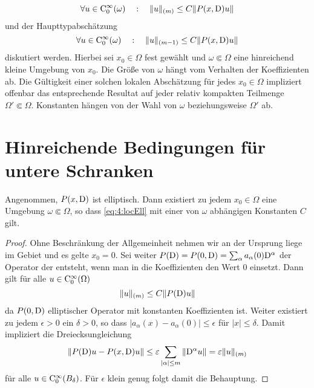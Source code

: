 \begin{equation}\label{eq:4:locEll}
\forall u\in\mathrm C_0^\infty(\omega)\quad:\quad    \| u\|_{(m)} \le C \| P(x,\mathrm D) u \|
\end{equation}
und der Haupttypabschätzung 
\begin{equation}\label{eq:4:locHT}
\forall u\in\mathrm C_0^\infty(\omega)\quad:\quad   \| u\|_{(m-1)} \le C \| P(x,\mathrm D) u \|
\end{equation}
diskutiert werden. Hierbei sei $x_0\in\Omega$ fest gewählt und $\omega\Subset\Omega$ eine hinreichend kleine Umgebung von $x_0$. Die Größe von $\omega$ hängt vom Verhalten der Koeffizienten ab. Die Gültigkeit einer solchen lokalen Abschätzung für jedes $x_0\in\Omega$ impliziert offenbar das entsprechende Resultat auf jeder relativ kompakten Teilmenge $\Omega'\Subset\Omega$. Konstanten hängen von der Wahl von $\omega$ beziehungsweise $\Omega'$ ab.



\section{Hinreichende Bedingungen für untere Schranken}


\begin{thm}\label{thm:4:4.1}
Angenommen, $P(x,\mathrm D)$ ist elliptisch. Dann existiert zu jedem $x_0\in\Omega$ eine Umgebung $\omega\Subset\Omega$, so dass
\eqref{eq:4:locEll} mit einer von $\omega$ abhängigen Konstanten $C$ gilt. 
\end{thm}
\begin{proof}
Ohne Beschränkung der Allgemeinheit nehmen wir an der Ursprung liege im Gebiet und es gelte $x_0=0$. Sei weiter $P(\mathrm D)=P(0,\mathrm D)=\sum_\alpha a_\alpha(0)\mathrm D^\alpha$ der Operator der entsteht, wenn man in die Koeffizienten den Wert $0$ einsetzt. Dann gilt für alle $u\in\mathrm C_0^\infty(\Omega)$
\begin{equation}
 \|u\|_{(m)} \le C  \| P(\mathrm D) u\| 
\end{equation}
da $P(0,\mathrm D)$ elliptischer Operator mit konstanten Koeffizienten ist. Weiter existiert zu jedem $\epsilon>0$ ein $\delta>0$, so dass
$|a_\alpha(x)-a_\alpha(0)|\le \epsilon$ für $|x|\le\delta$. Damit impliziert die Dreiecksungleichung
\begin{equation}
  \| P(\mathrm D) u - P(x,\mathrm D) u\| \le \varepsilon \sum_{|\alpha|\le m} \|\mathrm D^\alpha u\| = \varepsilon \|u\|_{(m)}
\end{equation}
für alle $u\in\mathrm C_0^\infty(B_\delta)$. Für $\epsilon$ klein genug folgt damit die Behauptung.
\end{proof}

